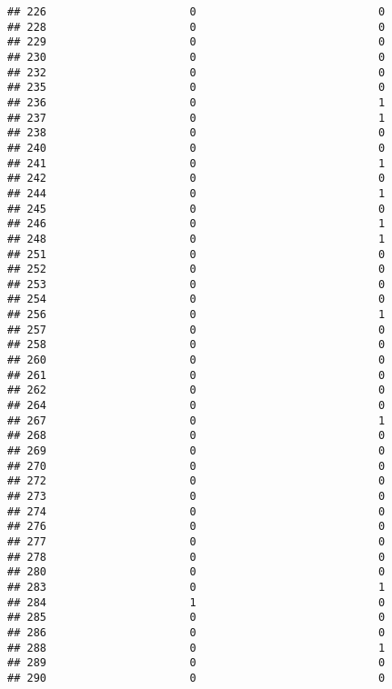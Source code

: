 \documentclass[
]{article}
\begin{document}
\begin{verbatim}
## 226                      0                            0
## 228                      0                            0
## 229                      0                            0
## 230                      0                            0
## 232                      0                            0
## 235                      0                            0
## 236                      0                            1
## 237                      0                            1
## 238                      0                            0
## 240                      0                            0
## 241                      0                            1
## 242                      0                            0
## 244                      0                            1
## 245                      0                            0
## 246                      0                            1
## 248                      0                            1
## 251                      0                            0
## 252                      0                            0
## 253                      0                            0
## 254                      0                            0
## 256                      0                            1
## 257                      0                            0
## 258                      0                            0
## 260                      0                            0
## 261                      0                            0
## 262                      0                            0
## 264                      0                            0
## 267                      0                            1
## 268                      0                            0
## 269                      0                            0
## 270                      0                            0
## 272                      0                            0
## 273                      0                            0
## 274                      0                            0
## 276                      0                            0
## 277                      0                            0
## 278                      0                            0
## 280                      0                            0
## 283                      0                            1
## 284                      1                            0
## 285                      0                            0
## 286                      0                            0
## 288                      0                            1
## 289                      0                            0
## 290                      0                            0

\end{verbatim}
\end{document}
